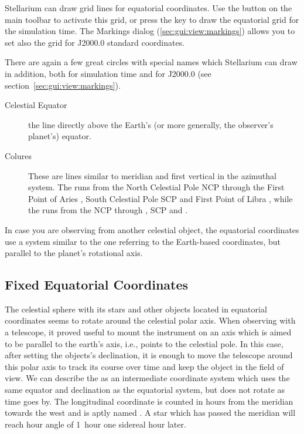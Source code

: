 Stellarium can draw grid lines for equatorial coordinates. Use the
button  on the main toolbar to activate
this grid, or press the  key to draw the equatorial grid for
the simulation time. The Markings dialog (\ref{sec:gui:view:markings})
allows you to set also the grid for J2000.0 standard coordinates.

There are again a few great circles with special names which
Stellarium can draw in addition, both for simulation time and for
J2000.0 (see section~\ref{sec:gui:view:markings}).
\begin{description}
\item[Celestial Equator] the line directly above the Earth's (or more
  generally, the observer's planet's) equator.
\item[Colures] These are lines similar to meridian and first vertical
  in the azimuthal system. The  runs from the
  North Celestial Pole NCP through the First Point of Aries \Aries,
  South Celestial Pole SCP and First Point of Libra \Libra, while the
   runs from the NCP through  \Cancer, SCP and  \Capricorn.
\end{description}

In case you are observing from another celestial object, the
equatorial coordinates use a system similar to the one referring to
the Earth-based coordinates, but parallel to the planet's rotational
axis.

\subsection{Fixed Equatorial Coordinates}
\label{sec:Concepts:FixedEquatorial}

The celestial sphere with its stars and other objects located in
equatorial coordinates seems to rotate around the celestial polar
axis. When observing with a telescope, it proved useful to mount the
instrument on an axis which is aimed to be parallel to the earth's
axis, i.e., points to the celestial pole. In this case, after setting
the objects's declination, it is enough to move the telescope around
this polar axis to track its course over time and keep the object in
the field of view. We can describe the  as an
  intermediate coordinate system which uses the same equator and
  declination as the equatorial system, but does not rotate as time
  goes by. The longitudinal coordinate is counted in hours from the
  meridian towards the west and is aptly named . A star which has passed the meridian will reach hour angle
  of 1~hour one sidereal hour later.

